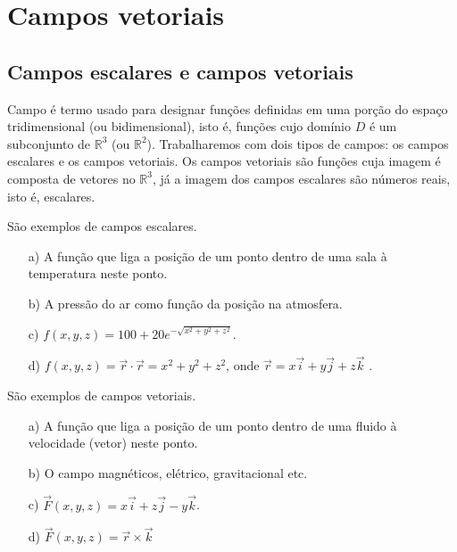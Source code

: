 
\chapter{Campos vetoriais}\label{cap:campos}


\section{Campos escalares e campos vetoriais}
 Campo é termo usado para designar funções definidas em uma porção do espaço tridimensional (ou bidimensional), isto é, funções cujo domínio $D$ é um subconjunto de $\mathbb{R}^3$ (ou $\mathbb{R}^2$). Trabalharemos com dois tipos de campos: os campos escalares e os campos vetoriais. Os campos vetoriais são funções cuja imagem é composta de vetores no $\mathbb{R}^3$, já a imagem dos campos escalares são números reais, isto é, escalares.
 
\begin{ex}\label{excampos} São exemplos de campos escalares.
\begin{itemize}
\item [a)] A função que liga a posição de um ponto dentro de uma sala à temperatura neste ponto.
\item [b)] A pressão do ar como função da posição na atmosfera.  
\item [c)] $f(x,y,z)= 100 + 20e^{-\sqrt{x^2+y^2+z^2}}$.
\item [d)] $f(x,y,z)= \vec{r} \cdot \vec{r} = x^2+y^2+z^2$, onde $\vec{r}=x\vec{i}+y\vec{j}+z\vec{k}$ .
\end{itemize}
\end{ex}   


\begin{ex}\label{excampos} São exemplos de campos vetoriais.
\begin{itemize}
\item [a)] A função que liga a posição de um ponto dentro de uma fluido à velocidade (vetor) neste ponto.
\item [b)] O campo magnéticos, elétrico, gravitacional etc.  
\item [c)] $\vec{F}(x,y,z)= x\vec{i} + z\vec{j} - y\vec{k}$.
\item [d)] $\vec{F}(x,y,z)= \vec{r}\times \vec{k}$
\end{itemize}
\end{ex}  

